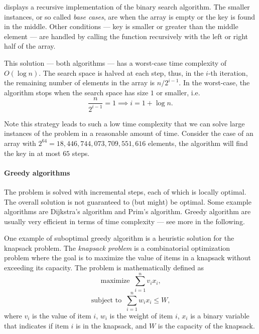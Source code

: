  displays a recursive implementation of the binary search algorithm.
The smaller instances, or so called \emph{base cases}, are when the array is empty or the key
is found in the middle.  Other conditions --- key is smaller or greater than the middle element ---
are handled by calling the function recursively with the left or right half of the array.


This solution --- both algorithms --- has a worst-case time complexity of $O(\log n)$. The
search space is halved at each step, thus, in the $i$-th iteration, the remaining number
of elements in the array is $n / 2^{i-1}$.  In the worst-case, the algorithm stops when the
search space has size $1$ or smaller, i.e.
\[
  \frac{n}{2^{i-1}} = 1 \implies
  i = 1 + \log n\text{.}
\]

Note this strategy leads to such a low time complexity that we can solve large instances
of the problem in a reasonable amount of time.  Consider the case of an array with $2^{64}
= 18{,}446{,}744{,}073{,}709{,}551{,}616$ elements, the algorithm will find the key in at most $65$
steps.

\paragraph{Greedy algorithms}  The problem is solved with incremental steps, each of which
is locally optimal.  The overall solution is not guaranteed to (but might) be optimal.  Some example
algorithms are Dijkstra's algorithm and Prim's algorithm.  Greedy algorithm are usually
very efficient in terms of time complexity --- see more in the following.

One example of suboptimal greedy algorithm is a heuristic solution for the knapsack problem.
The \emph{knapsack problem} is a combinatorial optimization problem where the goal is to
maximize the value of items in a knapsack without exceeding its capacity.  The problem is
mathematically defined as
\[
  \text{maximize }~\sum_{i = 1}^n v_i x_i\text{,}
\]
\[
  \text{subject to }~\sum_{i = 1}^n w_i x_i \leq W\text{,}
\]
where $v_i$ is the value of item $i$, $w_i$ is the weight of item $i$, $x_i$ is a binary
variable that indicates if item $i$ is in the knapsack, and $W$ is the capacity of the
knapsack.

